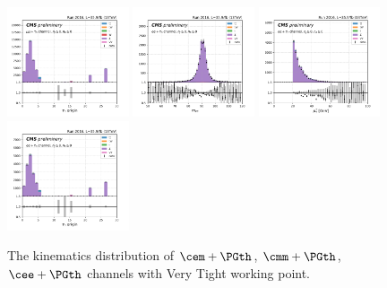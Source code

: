 \begin{figure}
    \includegraphics[width=0.32\textwidth]{chapters/Analysis/sectionCalibration/figures/jetToTauh/mumutau_tauGenFlavor_pickles_lltauVTight.png}
    \includegraphics[width=0.32\textwidth]{chapters/Analysis/sectionCalibration/figures/jetToTauh/eetau_dilepton_mass_pickles_lltauVTight.png}
    \includegraphics[width=0.32\textwidth]{chapters/Analysis/sectionCalibration/figures/jetToTauh/eetau_tauPt_pickles_lltauvTight.png}
    \includegraphics[width=0.32\textwidth]{chapters/Analysis/sectionCalibration/figures/jetToTauh/eetau_tauGenFlavor_pickles_lltauVTight.png}
    \caption{The kinematics distribution of $\cem+\PGth$, $\cmm+\PGth$, $\cee+\PGth$ channels with Very Tight \PGth working point.}
    \label{fig:analysis:calibration:llt_vtight}
\end{figure}







